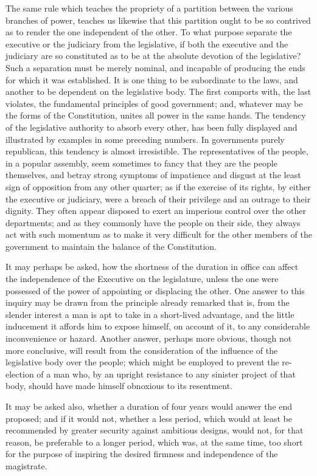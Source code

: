 The same rule which teaches the propriety of a partition between the various branches of power, teaches us likewise that this partition ought to be so contrived as to render the one independent of the other. To what purpose separate the executive or the judiciary from the legislative, if both the executive and the judiciary are so constituted as to be at the absolute devotion of the legislative? Such a separation must be merely nominal, and incapable of producing the ends for which it was established. It is one thing to be subordinate to the laws, and another to be dependent on the legislative body. The first comports with, the last violates, the fundamental principles of good government; and, whatever may be the forms of the Constitution, unites all power in the same hands. The tendency of the legislative authority to absorb every other, has been fully displayed and illustrated by examples in some preceding numbers. In governments purely republican, this tendency is almost irresistible. The representatives of the people, in a popular assembly, seem sometimes to fancy that they are the people themselves, and betray strong symptoms of impatience and disgust at the least sign of opposition from any other quarter; as if the exercise of its rights, by either the executive or judiciary, were a breach of their privilege and an outrage to their dignity. They often appear disposed to exert an imperious control over the other departments; and as they commonly have the people on their side, they always act with such momentum as to make it very difficult for the other members of the government to maintain the balance of the Constitution.

It may perhaps be asked, how the shortness of the duration in office can affect the independence of the Executive on the legislature, unless the one were possessed of the power of appointing or displacing the other. One answer to this inquiry may be drawn from the principle already remarked that is, from the slender interest a man is apt to take in a short-lived advantage, and the little inducement it affords him to expose himself, on account of it, to any considerable inconvenience or hazard. Another answer, perhaps more obvious, though not more conclusive, will result from the consideration of the influence of the legislative body over the people; which might be employed to prevent the re-election of a man who, by an upright resistance to any sinister project of that body, should have made himself obnoxious to its resentment.

It may be asked also, whether a duration of four years would answer the end proposed; and if it would not, whether a less period, which would at least be recommended by greater security against ambitious designs, would not, for that reason, be preferable to a longer period, which was, at the same time, too short for the purpose of inspiring the desired firmness and independence of the magistrate.

